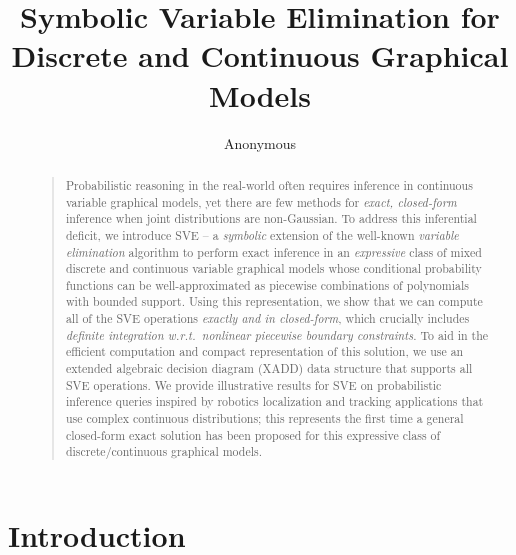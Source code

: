 \documentclass[letterpaper]{article}
\begin{document}
\title{Symbolic Variable Elimination for Discrete and Continuous Graphical Models}\author{Anonymous}

\maketitle
\begin{abstract}
\begin{quote}
Probabilistic reasoning in the real-world often requires inference in
continuous variable graphical models, yet there are few methods for
\emph{exact, closed-form} inference when joint distributions are
non-Gaussian.  To address this inferential deficit, we introduce SVE
-- a \emph{symbolic} extension of the well-known \emph{variable
elimination} algorithm to perform exact inference in an
\emph{expressive} class of mixed discrete and continuous variable
graphical models whose conditional probability functions can be
well-approximated as piecewise combinations of polynomials with
bounded support.  Using this representation, we show that we can
compute all of the SVE operations \emph{exactly and in closed-form},
which crucially includes \emph{definite integration w.r.t.\ nonlinear
piecewise boundary constraints}.  To aid in the efficient computation
and compact representation of this solution, we use an extended
algebraic decision diagram (XADD) data structure that supports all SVE
operations.  We provide illustrative results for SVE on probabilistic
inference queries inspired by robotics localization and tracking
applications that use complex continuous distributions; this
represents the first time a general closed-form exact solution
has been proposed for this expressive class of discrete/continuous
graphical models.
\end{quote}
\end{abstract}

\section{Introduction}

\label{sec:intro}
\end{document}
